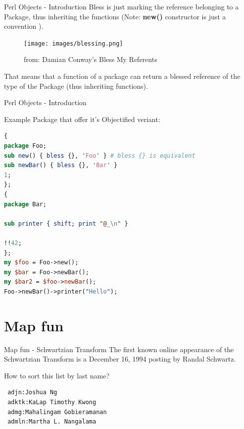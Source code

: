 \documentclass[10pt]{beamer}
\begin{document}
\begin{frame}[fragile]{Perl Objects - Introduction}
Bless is just marking the reference belonging to a Package, thus inheriting the functions (Note: \textbf{new()} constructor  is just a convention ).
\begin{figure}
    \centering
    \texttt{[image: images/blessing.png]}
    \caption{from: Damian Conway's Bless My Referents}
    \label{fig:bless}
\end{figure}

That means that a function of a package can return a blessed reference of the type of the Package (thus inheriting functions).
\end{frame}
\begin{frame}[fragile]{Perl Objects - Introduction}

Example Package that offer it's Objectified veriant:
\begin{lstlisting}[language=perl]
{
package Foo;
sub new() { bless {}, 'Foo' } # bless {} is equivalent
sub newBar() { bless {}, 'Bar' }
1;
};
{
package Bar;

sub printer { shift; print "@_\n" }

!!42;
};
my $foo = Foo->new();
my $bar = Foo->newBar();
my $bar2 = $foo->newBar();
Foo->newBar()->printer("Hello");
\end{lstlisting}

\end{frame}


 \section{Map fun}

 \begin{frame}[fragile]{Map fun - Schwartzian Transform}
The first known online appearance of the Schwartzian Transform is a December 16, 1994 posting by Randal Schwartz.

How to sort this list by last name?

\begin{lstlisting}
 adjn:Joshua Ng
 adktk:KaLap Timothy Kwong
 admg:Mahalingam Gobieramanan
 admln:Martha L. Nangalama
\end{lstlisting}


\end{frame}
\end{document}
